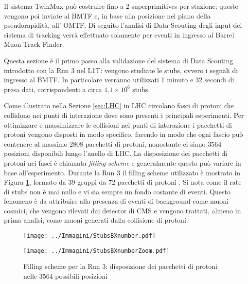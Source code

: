 Il sistema TwinMux può costruire fino a 2 superprimitives per stazione; queste vengono poi inviate al BMTF e, in base alla posizione nel piano della pseudorapidità, all' OMTF. Di seguito l'analisi di Data Scouting degli input del sistema di tracking verrà effettuato solamente per eventi in ingresso al Barrel Muon Track Finder.

Questa sezione è il primo passo alla validazione del sistema di Data Scouting introdotto con la Run 3 nel L1T: vengono studiate le stubs, ovvero i segnali di ingresso al BMTF. In particolare verranno utilizzati 1 minuto e 32 secondi di presa dati, corrispondenti a circa $1.1 \times 10^{6}$ stubs. 

Come illustrato nella Sezione \ref{sec:LHC} in LHC circolano fasci di protoni che collidono nei punti di interazione dove sono presenti i principali esperimenti. Per ottimizzare e massimizzare le collisioni nei punti di interazione i pacchetti di protoni vengono disposti in modo specifico, facendo in modo che ogni fascio può contenere al massimo 2808 pacchetti di protoni, nonostante ci siano 3564 posizioni disponibili lungo l'anello di LHC. La disposizione dei pacchetti di protoni nei fasci è chiamata \textit{filling scheme} e generalmente questa può variare in base all'esperimento. Durante la Run 3 il filling scheme utilizzato è mostrato in Figura \ref{fig:StubsBX}, formato da 39 gruppi da 72 pacchetti di protoni \cite{Bailey}. \newline
Si nota come il rate di stubs non è mai nullo e vi sia sempre un fondo costante di eventi. Questo fenomeno è da attribuire alla presenza di eventi di background come muoni cosmici, che vengono rilevati dai detector di CMS e vengono trattati, almeno in prima analisi, come muoni generati dalla collisione di protoni.


 \begin{figure}[t]
   \centering
   \begin{minipage}[b]{0.49\textwidth}
       \centering
       \texttt{[image: ../Immagini/StubsBXnumber.pdf]} 
     \end{minipage}
     \hfill 
     \begin{minipage}[b]{0.49\textwidth}
       \centering
       \texttt{[image: ../Immagini/StubsBXnumberZoom.pdf]} 
   \end{minipage}
   \caption{Filling scheme per la Run 3: disposizione dei pacchetti di protoni nelle 3564 possibili posizioni }
   \label{fig:StubsBX}
 \end{figure}









